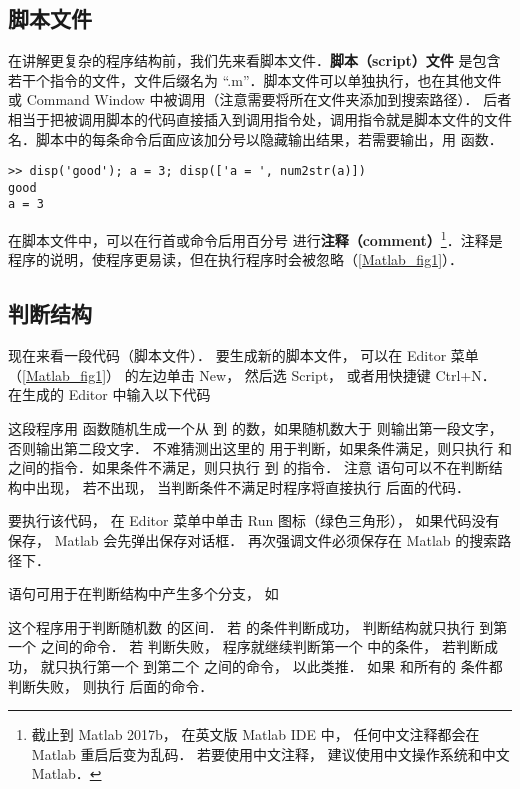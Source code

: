 

\subsection{脚本文件}
在讲解更复杂的程序结构前，我们先来看脚本文件．\textbf{脚本（script）文件} 是包含若干个指令的文件，文件后缀名为 “.m”．脚本文件可以单独执行，也在其他文件或 Command Window 中被调用（注意需要将所在文件夹添加到搜索路径）． 后者相当于把被调用脚本的代码直接插入到调用指令处，调用指令就是脚本文件的文件名．脚本中的每条命令后面应该加分号以隐藏输出结果，若需要输出，用  函数．
\begin{lstlisting}[language=MatlabCom]
>> disp('good'); a = 3; disp(['a = ', num2str(a)])
good
a = 3
\end{lstlisting}
在脚本文件中，可以在行首或命令后用百分号 \x{\%} 进行\textbf{注释（comment）}\footnote{截止到 Matlab 2017b， 在英文版 Matlab IDE 中， 任何中文注释都会在 Matlab 重启后变为乱码． 若要使用中文注释， 建议使用中文操作系统和中文 Matlab．}．注释是程序的说明，使程序更易读，但在执行程序时会被忽略（\autoref{Matlab_fig1}）．

\subsection{判断结构}
现在来看一段代码（脚本文件）． 要生成新的脚本文件， 可以在 Editor 菜单（\autoref{Matlab_fig1}） 的左边单击 New， 然后选 Script， 或者用快捷键 Ctrl+N． 在生成的 Editor 中输入以下代码


这段程序用  函数随机生成一个从  到  的数，如果随机数大于  则输出第一段文字，否则输出第二段文字． 不难猜测出这里的  用于判断，如果条件满足，则只执行  和  之间的指令．如果条件不满足，则只执行  到  的指令． 注意  语句可以不在判断结构中出现， 若不出现， 当判断条件不满足时程序将直接执行  后面的代码．

要执行该代码， 在 Editor 菜单中单击 Run 图标（绿色三角形）， 如果代码没有保存， Matlab 会先弹出保存对话框． 再次强调文件必须保存在 Matlab 的搜索路径下．

 语句可用于在判断结构中产生多个分支， 如


这个程序用于判断随机数  的区间． 若  的条件判断成功， 判断结构就只执行  到第一个  之间的命令． 若  判断失败， 程序就继续判断第一个  中的条件， 若判断成功， 就只执行第一个  到第二个  之间的命令， 以此类推． 如果  和所有的  条件都判断失败， 则执行  后面的命令．

